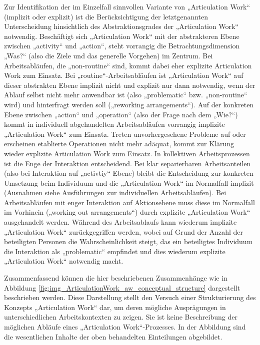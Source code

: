 Zur Identifikation der im Einzelfall sinnvollen Variante von „Articulation Work“ (implizit oder explizit) ist die Berücksichtigung der letztgenannten Unterscheidung hinsichtlich des Abstraktionsgrades der „Articulation Work“ notwendig. Beschäftigt sich „Articulation Work“ mit der abstrakteren Ebene zwischen „activity“ und „action“, steht vorrangig die Betrachtungsdimension „Was?“ (also die Ziele und das generelle Vorgehen) im Zentrum. Bei Arbeitsabläufen, die „non-routine“ sind, kommt dabei eher explizite Articulation Work zum Einsatz. Bei „routine“-Arbeitsabläufen ist „Articulation Work“ auf dieser abstrakten Ebene implizit nicht und explizit nur dann notwendig, wenn der Ablauf selbst nicht mehr anwendbar ist (also „problematic“ bzw. „non-routine“ wird) und hinterfragt werden soll („reworking arrangements“). Auf der konkreten Ebene zwischen „action“ und „operation“ (also der Frage nach dem „Wie?“) kommt in individuell abgehandelten Arbeitsabläufen vorrangig implizite „Articulation Work“ zum Einsatz. Treten unvorhergesehene Probleme auf oder erscheinen etablierte Operationen nicht mehr adäquat, kommt zur Klärung wieder explizite Articulation Work zum Einsatz. In kollektiven Arbeitsprozessen ist die Enge der Interaktion entscheidend. Bei klar separierbaren Arbeitsanteilen (also bei Interaktion auf „activtiy“-Ebene) bleibt die Entscheidung zur konkreten Umsetzung beim Individuum und die „Articulation Work“ im Normalfall implizit (Ausnahmen siehe Ausführungen zur individuellen Arbeitsabläufen). Bei Arbeitsabläufen mit enger Interaktion auf Aktionsebene muss diese im Normalfall im Vorhinein („working out arrangements“) durch explizite „Articulation Work“ ausgehandelt werden. Während des Arbeitsablaufs kann wiederum implizite „Articulation Work“ zurückgegriffen werden, wobei auf Grund der Anzahl der beteiligten Personen die Wahrscheinlichkeit steigt, das ein beteiligtes Individuum die Interaktion als „problematic“ empfindet und dies wiederum explizite „Articulation Work“ notwendig macht.

Zusammenfassend können die hier beschriebenen Zusammenhänge wie in Abbildung \ref{fig:img_ArticulationWork_aw_conceptual_structure} dargestellt beschrieben werden. Diese Darstellung stellt den Versuch einer Strukturierung des Konzepts „Articulation Work“ dar, um deren mögliche Ausprägungen in unterschiedlichen Arbeitskontexten zu zeigen. Sie ist keine Beschreibung der möglichen Abläufe eines „Articulation Work“-Prozesses. In der Abbildung sind die wesentlichen Inhalte der oben behandelten Einteilungen abgebildet.

